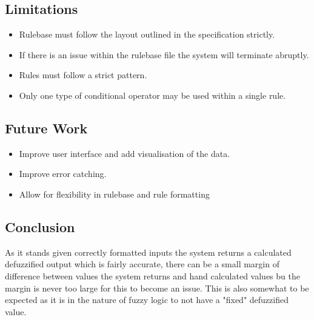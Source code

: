 \documentclass{article}
\begin{document}
\subsection{Limitations}
\begin{itemize}
  \item Rulebase must follow the layout outlined in the specification strictly.
  \item If there is an issue within the rulebase file the system will terminate abruptly.
  \item Rules must follow a strict pattern.
  \item Only one type of conditional operator may be used within a single rule.
\end{itemize}
\subsection{Future Work}
\begin{itemize}
  \item Improve user interface and add visualisation of the data.
  \item Improve error catching.
  \item Allow for flexibility in rulebase and rule formatting
\end{itemize}

\subsection{Conclusion}
As it stands given correctly formatted inputs the system returns a calculated defuzzified output which is fairly accurate, there can be a small margin of difference between values the system returns and hand calculated values bu the margin is never too large for this to become an issue. This is also somewhat to be expected as it is in the nature of fuzzy logic to not have a "fixed" defuzzified value.
\end{document}

